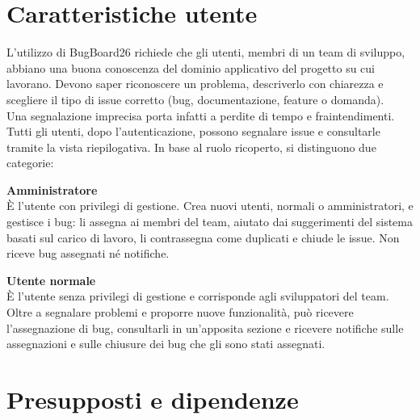 \clearpage

\section{Caratteristiche utente}
L'utilizzo di BugBoard26 richiede che gli utenti, membri di un team di sviluppo, abbiano una buona conoscenza del dominio applicativo del progetto su cui lavorano. Devono saper riconoscere un problema, descriverlo con chiarezza e scegliere il tipo di issue corretto (bug, documentazione, feature o domanda). \\
\indent Una segnalazione imprecisa porta infatti a perdite di tempo e fraintendimenti.
Tutti gli utenti, dopo l'autenticazione, possono segnalare issue e consultarle tramite la vista riepilogativa. In base al ruolo ricoperto, si distinguono due categorie:

\textbf{Amministratore}\\
È l'utente con privilegi di gestione. Crea nuovi utenti, normali o amministratori, e gestisce i bug: li assegna ai membri del team, aiutato dai suggerimenti del sistema basati sul carico di lavoro, li contrassegna come duplicati e chiude le issue. Non riceve bug assegnati né notifiche.

\textbf{Utente normale}\\
È l'utente senza privilegi di gestione e corrisponde agli sviluppatori del team. Oltre a segnalare problemi e proporre nuove funzionalità, può ricevere l'assegnazione di bug, consultarli in un'apposita sezione e ricevere notifiche sulle assegnazioni e sulle chiusure dei bug che gli sono stati assegnati.

\section{Presupposti e dipendenze}

